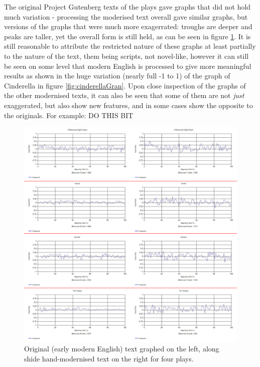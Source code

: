 \documentclass[a4paper]{article}
\begin{document}
        The original Project Gutenberg texts of the plays gave graphs that did not hold much variation - processing the moderised text overall gave similar graphs, but versions of the graphs that were much more exagerrated: troughs are deeper and peaks are taller, yet the overall form is still held, as can be seen in figure \ref{fig:emvsm}. It is still reasonable to attribute the restricted nature of these graphs at least partially to the nature of the text, them being scripts, not novel-like, however it can still be seen on some level that modern English is processed to give more meaningful results as shown in the huge variation (nearly full -1 to 1) of the graph of Cinderella in figure \ref{fig:cinderellaGran}. Upon close inspection of the graphs of the other modernised texts, it can also be seen that some of them are not \textit{just} exaggerated, but also show new features, and in some cases show the opposite to the originals. For example: DO THIS BIT
        \begin{figure}
            \includegraphics[width=1\textwidth]{Figures/EMvsM/EMvsM}
            \centering
            \caption{Original (early modern English) text graphed on the left, along shide hand-modernised text on the right for four plays.}
            \label{fig:emvsm}
        \end{figure}
\end{document}
